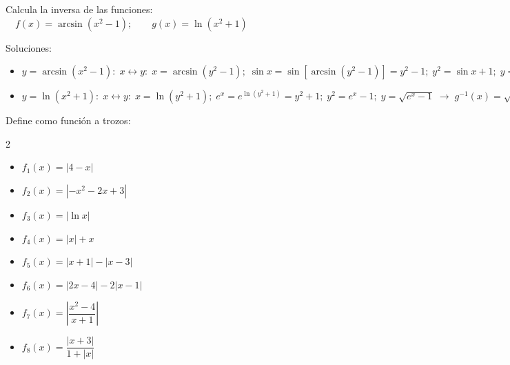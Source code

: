 {\begin{proofw}
		\end{proofw}
		
		
		
		\begin{ejre}
		Calcula la inversa de las funciones: $\quad f(x)=\arcsin (x^2-1); \qquad  g(x)=\ln (x^2+1)$
		\end{ejre}
		
		\begin{proofw}\renewcommand{\qedsymbol}{$\diamond$}
			
		Soluciones:
			
		\begin{itemize}
		\item[*] $y=\arcsin (x^2-1): \; x\leftrightarrow y: \; x=\arcsin (y^2-1); \; \sin x= \sin [\arcsin (y^2-1)]=y^2-1; \; y^2=\sin x +1; \; y=\sqrt{\sin x + 1} \; \to \; f^{-1}(x)=\sqrt{\sin x + 1}$	
		
		\item[*] $y=\ln (x^2+1): \; x\leftrightarrow y: \; x=\ln(y^2+1); \; e^x=e^{\ln (y^2+1)}=y^2+1; \; y^2=e^x-1; \; y=\sqrt{e^x-1} \; \to \; g^{-1}(x)= \sqrt{e^x-1}$
		\end{itemize}

		\end{proofw}
		
		
		
		
		
		\begin{ejre} Define como función a trozos: 
		\label{ejre:rompe-trozos}
			
			\begin{multicols}{2} 
			\begin{itemize}
			\item $f_1(x)=|4-x|$
			\item $f_2(x)=|-x^2-2x+3|$
			\item $f_3(x)=|\ln x|$
			\item $f_4(x)=|x|+x$
			\item $f_5(x)=|x+1|-|x-3|$
			\item $f_6(x)=|2x-4|-2|x-1|$
			\item $f_7(x)=\left| \dfrac {x^2-4}{x+1} \right|$
			\item $f_8(x)=\dfrac {|x+3|}{1+|x|}$
			\end{itemize}
			\end{multicols}
			\end{ejre}
		
		\begin{proofw}\renewcommand{\qedsymbol}{$\diamond$}
		

\end{proofw}}
